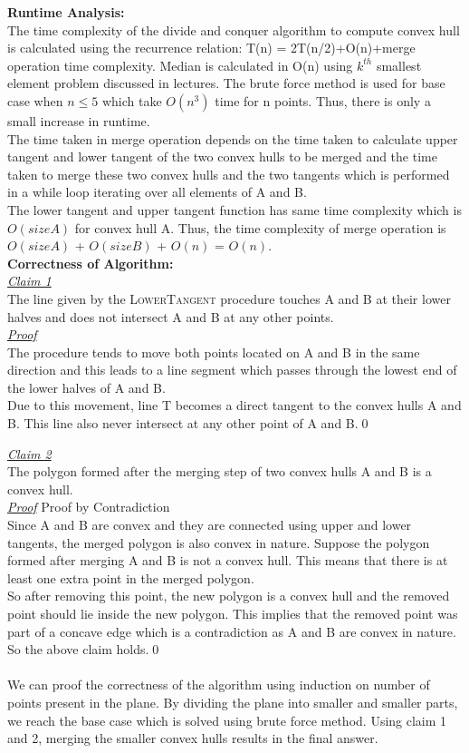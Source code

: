 \documentclass[a4paper]{article}
\begin{document}
\newpage
\textbf{Runtime Analysis:}\\

The time complexity of the divide and conquer algorithm to compute convex hull is calculated using the recurrence relation: T(n) = 2T(n/2)+O(n)+merge operation time complexity. Median is calculated in O(n) using $k^{th}$ smallest element problem discussed in lectures. The brute force method is used for base case when $n\leq5$ which take $O(n^3)$ time for n points. Thus, there is only a small increase in runtime.\\ 
The time taken in merge operation depends on the time taken to calculate upper tangent and lower tangent of the two convex hulls to be merged and the time taken to merge these two convex hulls and the two tangents which is performed in a while loop iterating over all elements of A and B.\\
The lower tangent and upper tangent function has same time complexity which is $O(size A)$ for convex hull A. Thus, the time complexity of merge operation is $O(size A)$ + $O(size B)$ + $O(n)$ = $O(n)$.\\

\textbf{Correctness of Algorithm:}\\

\textit{\underline{Claim 1}} \\
The line given by the \textsc{LowerTangent} procedure touches A and B at their lower halves and does not intersect A and B at any other points.\\
\textit{\underline{Proof}} \\
The procedure tends to move both points located on A and B in the same direction and this leads to a line segment which passes through the lowest end of the lower halves of A and B.\\
Due to this movement, line T becomes a direct tangent to the convex hulls A and B. This line also never intersect at any other point of A and B.{\hfill\qed}

\textit{\underline{Claim 2}} \\
The polygon formed after the merging step of two convex hulls A and B is a convex hull.\\
\textit{\underline{Proof}} Proof by Contradiction \\
Since A and B are convex and they are connected using upper and lower tangents, the merged polygon is also convex in nature. Suppose the polygon formed after merging A and B is not a convex hull. This means that there is at least one extra point in the merged polygon.\\
So after removing this point, the new polygon is a convex hull and the removed point should lie inside the new polygon. This implies that the removed point was part of a concave edge which is a contradiction as A and B are convex in nature.
So the above claim holds.{\hfill\qed}\\\\
We can proof the correctness of the algorithm using induction on number of points present in the plane. By dividing the plane into smaller and smaller parts, we reach the base case which is solved using brute force method. Using claim 1 and 2, merging the smaller convex hulls results in the final answer.
\end{document}
